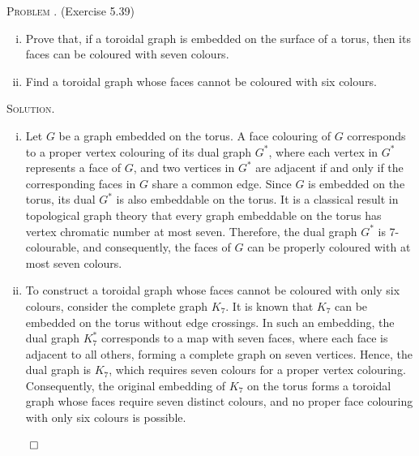 \documentclass[12pt, a4paper, oneside]{ctexart}
\newcounter{problemname}
\newenvironment{problem}{\begin{framed}\stepcounter{problemname}\par\noindent\textsc{Problem \arabic{problemname}. }}{\end{framed}\par}
\newenvironment{solution}{%
	\par\noindent\textsc{Solution. }\ignorespaces
}{%
	\hfill$\qed$\par
}
\begin{document}
    
	\begin{problem}
		(Exercise 5.39)

		\begin{enumerate}[(i)]
			\item Prove that, if a toroidal graph is embedded on the surface of a torus, then its faces can be coloured with seven colours.
			\item Find a toroidal graph whose faces cannot be coloured with six colours.
		\end{enumerate}

          
    \end{problem}

	\begin{solution}
       
        \begin{enumerate}[(i)]
		\item
		Let $G$ be a graph embedded on the torus. A face colouring of $G$ corresponds to a proper vertex colouring 
		of its dual graph $G^*$, where each vertex in $G^*$ represents a face of $G$, and two vertices in $G^*$ are 
		adjacent if and only if the corresponding faces in $G$ share a common edge. Since $G$ is embedded on the torus, 
		its dual $G^*$ is also embeddable on the torus. It is a classical result in topological graph theory that every 
		graph embeddable on the torus has vertex chromatic number at most seven. Therefore, the dual graph $G^*$ is 
		7-colourable, and consequently, the faces of $G$ can be properly coloured with at most seven colours.

		\item
		To construct a toroidal graph whose faces cannot be coloured with only six colours, consider the complete graph $K_7$. It is known that $K_7$ can be embedded on the torus without edge crossings. In such an embedding, the dual graph $K_7^*$ corresponds to a map with seven faces, where each face is adjacent to all others, forming a complete graph on seven vertices. Hence, the dual graph is $K_7$, which requires seven colours for a proper vertex colouring. Consequently, the original embedding of $K_7$ on the torus forms a toroidal graph whose faces require seven distinct colours, and no proper face colouring with only six colours is possible.

		\end{enumerate}
		
	\end{solution}


	
     

    
\end{document}
